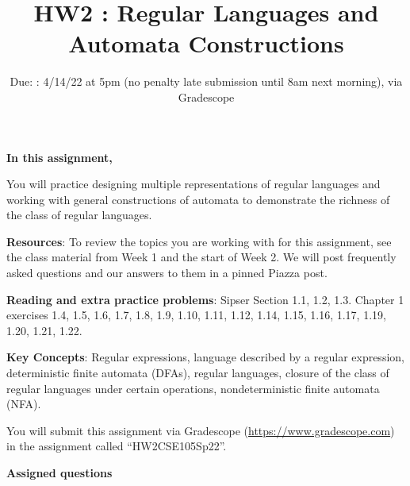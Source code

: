 

\title{HW2 : Regular Languages and Automata Constructions}
\date{Due: : 4/14/22 at 5pm (no penalty late submission until 8am next morning), via Gradescope}


\maketitle
\thispagestyle{fancy}


{\bf In this assignment,}

You will practice designing multiple representations of regular languages
and working with general constructions of automata to demonstrate the 
richness of the class of regular languages.

{\bf Resources}: To review the topics you are working with 
for this assignment, see the class material from  Week 1 and the start of Week 2.
We will post frequently asked questions and our answers to them in a 
pinned Piazza post.

{\bf Reading and extra practice problems}: Sipser Section 1.1, 1.2, 1.3.
Chapter 1 exercises 1.4, 1.5, 1.6, 1.7, 1.8, 1.9, 1.10, 1.11, 1.12, 1.14, 1.15, 1.16, 1.17, 1.19, 1.20, 1.21, 1.22.

{\bf Key Concepts}: Regular expressions, language described by a regular expression, deterministic finite automata (DFAs), 
regular languages, closure of the class of regular languages under certain operations, 
nondeterministic finite automata (NFA).


\instructions

You will submit this assignment via Gradescope
(\href{https://www.gradescope.com}{https://www.gradescope.com}) 
in the assignment called ``HW2CSE105Sp22''.

{\bf Assigned questions}


